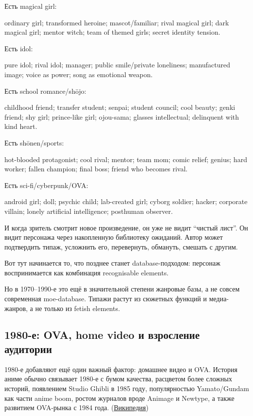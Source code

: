 Есть magical girl:

ordinary girl; transformed heroine; mascot/\hspace{0pt}familiar; rival magical girl;
dark magical girl; mentor witch; team of themed girls; secret identity
tension.

Есть idol:

pure idol; rival idol; manager; public smile/\hspace{0pt}private loneliness;
manufactured image; voice as power; song as emotional weapon.

Есть school romance/\hspace{0pt}shōjo:

childhood friend; transfer student; senpai; student council; cool
beauty; genki friend; shy girl; prince-like girl; ojou-sama; glasses
intellectual; delinquent with kind heart.

Есть shōnen/\hspace{0pt}sports:

hot-blooded protagonist; cool rival; mentor; team mom; comic relief;
genius; hard worker; fallen champion; final boss; friend who becomes
rival.

Есть sci-fi/\hspace{0pt}cyberpunk/\hspace{0pt}OVA:

android girl; doll; psychic child; lab-created girl; cyborg soldier;
hacker; corporate villain; lonely artificial intelligence; posthuman
observer.

И когда зритель смотрит новое произведение, он уже не видит ``чистый
лист''. Он видит персонажа через накопленную библиотеку ожиданий. Автор
может подтвердить типаж, усложнить его, перевернуть, обмануть, смешать с
другим.

Вот тут начинается то, что позднее станет database-подходом: персонаж
воспринимается как комбинация recognisable elements.

Но в 1970--1990-е это ещё в значительной степени жанровые базы, а не
совсем современная moe-database. Типажи растут из сюжетных функций и
медиа-жанров, а не только из fetish elements.

\subsection*{1980-е: OVA, home video и взросление аудитории}

1980-е добавляют ещё один важный фактор: домашнее видео и OVA. История
аниме обычно связывает 1980-е с бумом качества, расцветом более сложных
историй, появлением Studio Ghibli в 1985 году, популярностью
Yamato/\hspace{0pt}Gundam как части anime boom, ростом журналов вроде Animage и
Newtype, а также развитием OVA-рынка с 1984 года.
(\href{https://en.wikipedia.org/wiki/History_of_anime?utm_source=chatgpt.com}{Википедия})

